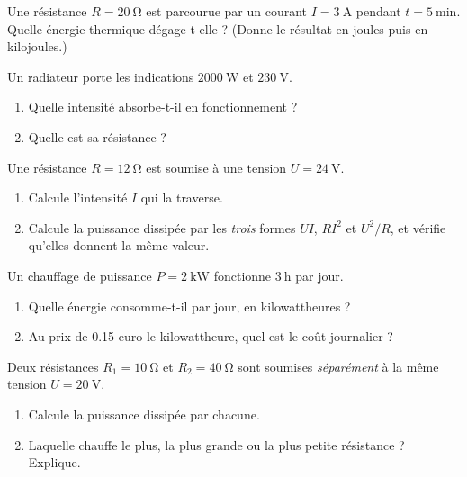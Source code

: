 \documentclass[11pt,a4paper]{article}
\begin{document}
\usetikzlibrary{babel}
\begin{exo}
Une résistance $R=\qty{20}{\ohm}$ est parcourue par un courant $I=\qty{3}{\ampere}$ pendant
$t=\qty{5}{\minute}$. Quelle énergie thermique dégage-t-elle ? (Donne le résultat en joules puis en
kilojoules.)
\end{exo}

\begin{exo}
Un radiateur porte les indications $\qty{2000}{\watt}$ et $\qty{230}{\volt}$.
\begin{enumerate}[label=\alph*)]
  \item Quelle intensité absorbe-t-il en fonctionnement ?
  \item Quelle est sa résistance ?
\end{enumerate}
\end{exo}

\begin{exo}
Une résistance $R=\qty{12}{\ohm}$ est soumise à une tension $U=\qty{24}{\volt}$.
\begin{enumerate}[label=\alph*)]
  \item Calcule l'intensité $I$ qui la traverse.
  \item Calcule la puissance dissipée par les \emph{trois} formes $UI$, $RI^2$ et $U^2/R$, et vérifie
        qu'elles donnent la même valeur.
\end{enumerate}
\end{exo}

\begin{exo}
Un chauffage de puissance $P=\qty{2}{\kilo\watt}$ fonctionne $\qty{3}{\hour}$ par jour.
\begin{enumerate}[label=\alph*)]
  \item Quelle énergie consomme-t-il par jour, en kilowattheures ?
  \item Au prix de \num{0.15} euro le kilowattheure, quel est le coût journalier ?
\end{enumerate}
\end{exo}

\begin{exo}
Deux résistances $R_1=\qty{10}{\ohm}$ et $R_2=\qty{40}{\ohm}$ sont soumises \emph{séparément} à la
même tension $U=\qty{20}{\volt}$.
\begin{enumerate}[label=\alph*)]
  \item Calcule la puissance dissipée par chacune.
  \item Laquelle chauffe le plus, la plus grande ou la plus petite résistance ? Explique.
\end{enumerate}
\end{exo}
\end{document}
